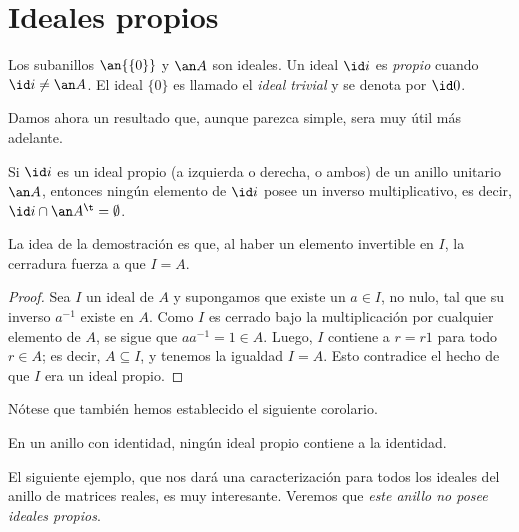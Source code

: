 \section{Ideales propios}
	\begin{ejem} 
	Los subanillos $\an{\{0\}}$ y $\an A$ son ideales. Un ideal $\id i$ es {\it propio} cuando $\id i \neq\an A$. El ideal $\{0\}$ es llamado el {\it ideal trivial} y se denota por $\id 0$.
\end{ejem} 
Damos ahora un resultado que, aunque parezca simple, sera muy útil más adelante.
\begin{teo}  
		Si $\id i$ es un ideal propio (a izquierda o derecha, o ambos) de un anillo unitario $\an A$, entonces ningún elemento de $\id i$ posee un inverso multiplicativo, es decir, $\id i \cap \an A^{\t} = \emptyset$.
\end{teo}
\begin{nota}
	La idea de la demostración es que, al haber un elemento invertible en $I$, la cerradura fuerza a que $I=A$.
\end{nota}
\begin{proof} 
	Sea $I$ un ideal de $A$ y supongamos que existe un $a \in I$, no nulo, tal que su inverso $a^{-1}$ existe en $A$. Como $I$ es cerrado bajo la multiplicación por cualquier elemento de $A$, se sigue que $aa^{-1}=1 \in A$. Luego, $I$ contiene a $r = r1$ para todo $r \in A$; es decir, $A \subseteq I$, y tenemos la igualdad $I=A$. Esto contradice el hecho de que $I$ era un ideal propio.
\end{proof}
%
Nótese que también hemos establecido el siguiente corolario.
\begin{cor} 
		En un anillo con identidad, ningún ideal propio contiene a la identidad.
\end{cor} 
%
El siguiente ejemplo, que nos dará una caracterización para todos los ideales del anillo de matrices reales, es muy interesante. Veremos que \textit{este anillo no posee ideales propios}. 

